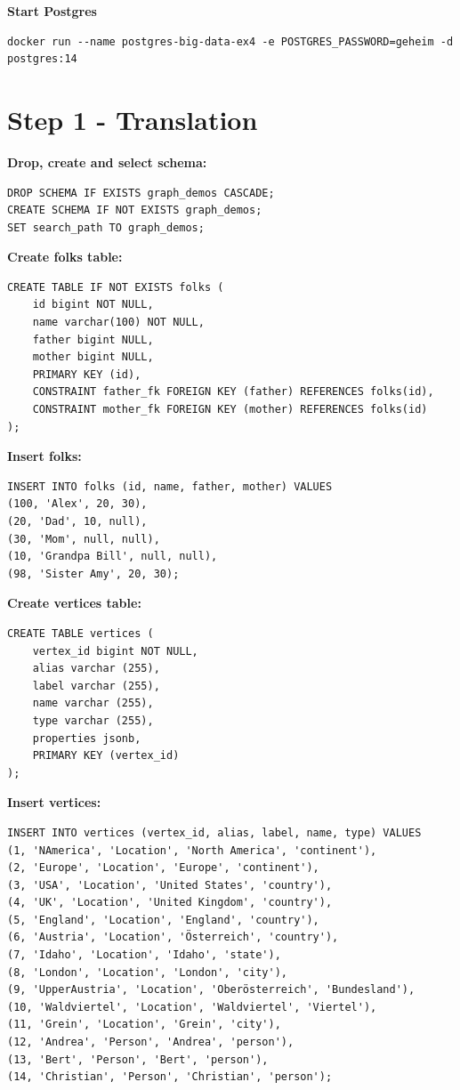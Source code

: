 \documentclass[14pt,a4paper]{extarticle}
\begin{document}
	\noindent \textbf{Start Postgres}
	\begin{lstlisting}[style=fish]
docker run --name postgres-big-data-ex4 -e POSTGRES_PASSWORD=geheim -d postgres:14
	\end{lstlisting}

	\section*{Step 1 - Translation}
	\noindent \textbf{Drop, create and select schema:}
	\begin{lstlisting}[style=sql]
DROP SCHEMA IF EXISTS graph_demos CASCADE;
CREATE SCHEMA IF NOT EXISTS graph_demos;
SET search_path TO graph_demos;
	\end{lstlisting}

	\noindent \textbf{Create folks table:}
	\begin{lstlisting}[style=sql]
CREATE TABLE IF NOT EXISTS folks (
	id bigint NOT NULL,
	name varchar(100) NOT NULL,
	father bigint NULL,
	mother bigint NULL,
	PRIMARY KEY (id),
	CONSTRAINT father_fk FOREIGN KEY (father) REFERENCES folks(id),
	CONSTRAINT mother_fk FOREIGN KEY (mother) REFERENCES folks(id)
);
	\end{lstlisting}

	\noindent \textbf{Insert folks:}
	\begin{lstlisting}[style=sql]
INSERT INTO folks (id, name, father, mother) VALUES
(100, 'Alex', 20, 30),
(20, 'Dad', 10, null),
(30, 'Mom', null, null),
(10, 'Grandpa Bill', null, null),
(98, 'Sister Amy', 20, 30);
	\end{lstlisting}

	\noindent \textbf{Create vertices table:}
	\begin{lstlisting}[style=sql]
CREATE TABLE vertices (
	vertex_id bigint NOT NULL,
	alias varchar (255),
	label varchar (255),
	name varchar (255),
	type varchar (255),
	properties jsonb,
	PRIMARY KEY (vertex_id)
);
	\end{lstlisting}

	\noindent \textbf{Insert vertices:}
	\begin{lstlisting}[style=sql]
INSERT INTO vertices (vertex_id, alias, label, name, type) VALUES
(1, 'NAmerica', 'Location', 'North America', 'continent'),
(2, 'Europe', 'Location', 'Europe', 'continent'),
(3, 'USA', 'Location', 'United States', 'country'),
(4, 'UK', 'Location', 'United Kingdom', 'country'),
(5, 'England', 'Location', 'England', 'country'),
(6, 'Austria', 'Location', 'Österreich', 'country'),
(7, 'Idaho', 'Location', 'Idaho', 'state'),
(8, 'London', 'Location', 'London', 'city'),
(9, 'UpperAustria', 'Location', 'Oberösterreich', 'Bundesland'),
(10, 'Waldviertel', 'Location', 'Waldviertel', 'Viertel'),
(11, 'Grein', 'Location', 'Grein', 'city'),
(12, 'Andrea', 'Person', 'Andrea', 'person'),
(13, 'Bert', 'Person', 'Bert', 'person'),
(14, 'Christian', 'Person', 'Christian', 'person');
	\end{lstlisting}
\end{document}
